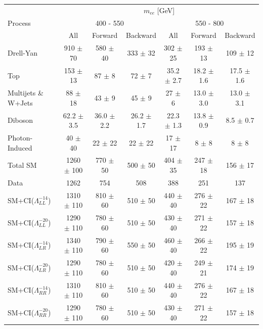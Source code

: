 	\begin {table}[h]
		\footnotesize 
		\begin{center}
		\begin{tabular}{  l | c c c | c c c  } 
			\hline
			\hline
			\multirow{3}{*}{Process} 	& \multicolumn{6}{c}{$m_{ee}$ [GeV]} \\
										& \multicolumn{3}{c}{400 - 550} & \multicolumn{3}{c}{550 - 800} \\
										\cline{2-7}
										& All & Forward & Backward & All & Forward & Backward \\
			\hline
			Drell-Yan & 910 $\pm$ 70 & 580 $\pm$ 40 & 333 $\pm$ 32 & 302 $\pm$ 25 & 193 $\pm$ 13 & 109 $\pm$ 12 \\
			Top & 153 $\pm$ 13 & 87 $\pm$ 8 & 72 $\pm$ 7 & 35.2 $\pm$ 2.7 & 18.2 $\pm$ 1.6 & 17.5 $\pm$ 1.6 \\
			Multijets \& W+Jets & 88 $\pm$ 18 & 43 $\pm$ 9 & 45 $\pm$ 9 & 27 $\pm$ 6 & 13.0 $\pm$ 3.0 & 13.0 $\pm$ 3.1 \\
			Diboson & 62.2 $\pm$ 3.5 & 36.0 $\pm$ 2.2 & 26.2 $\pm$ 1.7 & 22.3 $\pm$ 1.3 & 13.8 $\pm$ 0.9 & 8.5 $\pm$ 0.7 \\
			Photon-Induced & 40 $\pm$ 40 & 22 $\pm$ 22 & 22 $\pm$ 22 & 17 $\pm$ 17 & 8 $\pm$ 8 & 8 $\pm$ 8 \\
			\hline
			Total SM & 1260 $\pm$ 100 & 770 $\pm$ 50 & 500 $\pm$ 50 & 404 $\pm$ 35 & 247 $\pm$ 18 & 156 $\pm$ 17 \\
			\hline
			Data & 1262 & 754 & 508 & 388 & 251 & 137 \\
			\hline
			SM+CI($\Lambda^{-14}_{LL}$) & 1310 $\pm$ 110 & 810 $\pm$ 60 & 510 $\pm$ 50 & 440 $\pm$ 40 & 276 $\pm$ 22 & 167 $\pm$ 18 \\
			SM+CI($\Lambda^{-20}_{LL}$) & 1290 $\pm$ 110 & 780 $\pm$ 60 & 510 $\pm$ 50 & 430 $\pm$ 40 & 271 $\pm$ 22 & 157 $\pm$ 18 \\
			SM+CI($\Lambda^{-14}_{LR}$) & 1340 $\pm$ 110 & 790 $\pm$ 60 & 550 $\pm$ 50 & 460 $\pm$ 40 & 266 $\pm$ 22 & 195 $\pm$ 19 \\
			SM+CI($\Lambda^{-20}_{LR}$) & 1290 $\pm$ 110 & 780 $\pm$ 60 & 510 $\pm$ 50 & 420 $\pm$ 40 & 249 $\pm$ 21 & 174 $\pm$ 19 \\
			SM+CI($\Lambda^{-14}_{RR}$) & 1310 $\pm$ 110 & 810 $\pm$ 60 & 510 $\pm$ 50 & 440 $\pm$ 40 & 276 $\pm$ 22 & 167 $\pm$ 18 \\
			SM+CI($\Lambda^{-20}_{RR}$) & 1290 $\pm$ 110 & 780 $\pm$ 60 & 510 $\pm$ 50 & 430 $\pm$ 40 & 271 $\pm$ 22 & 157 $\pm$ 18 \\
			\hline

\end{tabular}
\end{center}
\end{table}
